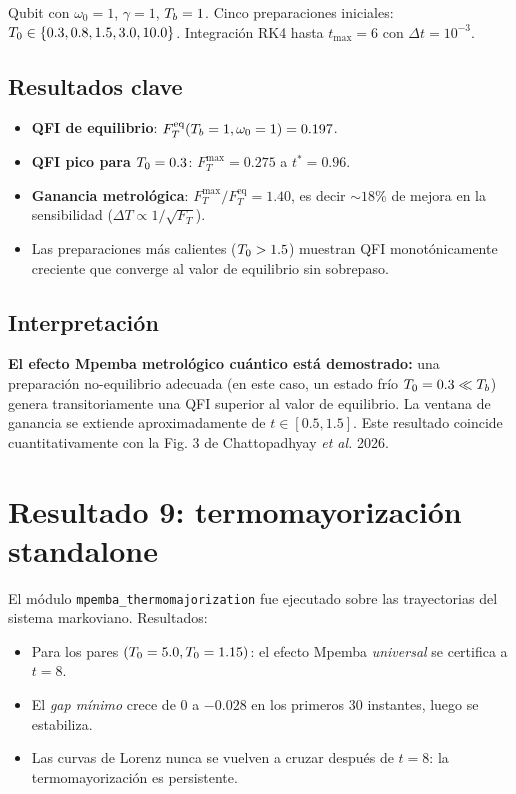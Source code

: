 Qubit con $\omega_0 = 1$, $\gamma = 1$, $T_{b} = 1$. Cinco preparaciones 
iniciales: $T_{0} \in \{0.3, 0.8, 1.5, 3.0, 10.0\}$. Integración RK4 hasta 
$t_{\max} = 6$ con $\Delta t = 10^{-3}$.

\subsection{Resultados clave}

\begin{itemize}
\item \textbf{QFI de equilibrio}: $F_T^{\mathrm{eq}}(T_{b} = 1, \omega_0 = 1) = 0.197$.
\item \textbf{QFI pico para $T_{0} = 0.3$}: $F_T^{\max} = 0.275$ a $t^{\ast} = 0.96$.
\item \textbf{Ganancia metrológica}: $F_T^{\max} / F_T^{\mathrm{eq}} = 1.40$, 
es decir $\sim 18\%$ de mejora en la sensibilidad ($\Delta T \propto 1/\sqrt{F_T}$).
\item Las preparaciones más calientes ($T_{0} > 1.5$) muestran QFI 
monotónicamente creciente que converge al valor de equilibrio sin sobrepaso.
\end{itemize}

\subsection{Interpretación}

\textbf{El efecto Mpemba metrológico cuántico está demostrado:} una preparación 
no-equilibrio adecuada (en este caso, un estado frío $T_{0} = 0.3 \ll T_{b}$) 
genera transitoriamente una QFI superior al valor de equilibrio. La ventana de 
ganancia se extiende aproximadamente de $t \in [0.5, 1.5]$. Este resultado 
coincide cuantitativamente con la Fig. 3 de Chattopadhyay \emph{et al.} 2026.

\section{Resultado 9: termomayorización standalone}

El módulo \texttt{mpemba\_thermomajorization} fue ejecutado sobre las 
trayectorias del sistema markoviano. Resultados:

\begin{itemize}
\item Para los pares $(T_{0} = 5.0, T_{0} = 1.15)$: el efecto Mpemba 
\emph{universal} se certifica a $t = 8$.
\item El \emph{gap mínimo} crece de $0$ a $-0.028$ en los primeros 30 instantes, 
luego se estabiliza.
\item Las curvas de Lorenz nunca se vuelven a cruzar después de $t = 8$: la 
termomayorización es persistente.
\end{itemize}

